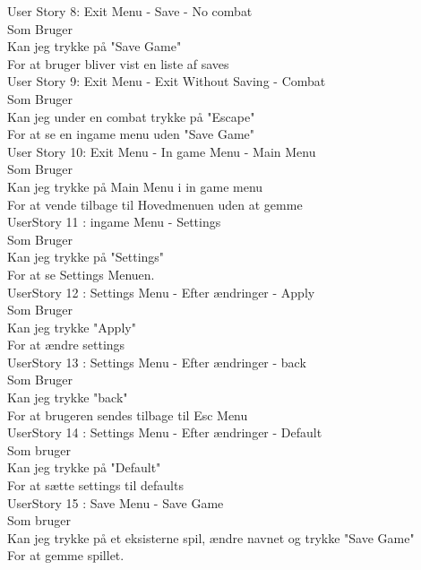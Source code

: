 User Story 8: Exit Menu - Save - No combat\\
  Som Bruger \\
  Kan jeg trykke på "Save Game" \\
  For at bruger bliver vist en liste af saves\\

User Story 9: Exit Menu - Exit Without Saving - Combat\\
  Som Bruger\\
  Kan jeg under en combat trykke på "Escape" \\
  For at se en ingame menu uden "Save Game"\\

User Story 10: Exit Menu - In game Menu - Main Menu\\
  Som Bruger\\
  Kan jeg trykke på Main Menu i in game menu \\
  For at vende tilbage til Hovedmenuen uden at gemme\\

UserStory 11 : ingame Menu - Settings\\
  Som Bruger \\
  Kan jeg trykke på "Settings" \\
  For at se Settings Menuen.\\

UserStory 12 : Settings Menu - Efter ændringer - Apply\\
  Som Bruger \\
  Kan jeg  trykke "Apply" \\
  For at ændre settings\\

UserStory 13 : Settings Menu - Efter ændringer - back\\
  Som Bruger \\
  Kan jeg trykke "back" \\
  For at brugeren sendes tilbage til Esc Menu\\

UserStory 14 : Settings Menu - Efter ændringer - Default\\
  Som bruger \\
  Kan jeg trykke på "Default" \\
  For at sætte settings til defaults\\
  
UserStory 15 : Save Menu - Save Game\\
  Som bruger \\
  Kan jeg trykke på et eksisterne spil, ændre navnet og trykke "Save Game" \\
  For at gemme spillet.\\
  
